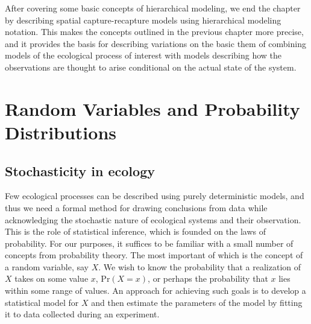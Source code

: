 After covering some basic concepts of hierarchical modeling, we end the
chapter by describing spatial capture-recapture models using
hierarchical modeling notation. This makes the concepts outlined in
the previous chapter more precise, and it provides the basis for describing
variations on the basic them of combining models of the ecological
process of interest with models describing how the observations are
thought to arise conditional on the actual state of the system.


\section{Random Variables and Probability Distributions}

\subsection{Stochasticity in ecology}


Few ecological processes can be described using purely deterministic
models, and thus we need a formal method for drawing conclusions from data while
acknowledging the stochastic nature of ecological systems and their observation. This is the role of statistical inference,
which is founded on the laws of probability. For our purposes, it
suffices to be familiar with a small number of concepts from
probability theory. The most important of which is the concept of a random
variable, say $X$. We wish to know the probability that a realization
of $X$ takes on some value $x$, %
$\text{Pr}(X=x)$, or perhaps the probability that $x$ lies within some
range of values. An approach for achieving such goals is to develop a
statistical model for $X$ and then estimate the parameters of the
model by fitting it to data collected during an experiment.

